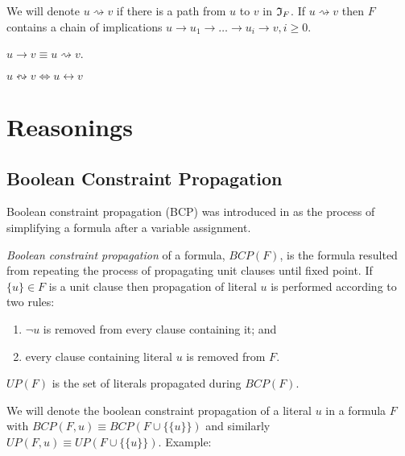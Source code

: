 We will denote $u \rightsquigarrow v$ if there is a path from $u$
to $v$ in $\mathfrak{I}_F$. If $u \rightsquigarrow v$ then $F$ contains a chain
of implications $u \rightarrow u_1 \rightarrow \ldots \rightarrow u_i
\rightarrow v, i \ge 0$.

\begin{myprop}
  $u \rightarrow v \equiv u \rightsquigarrow v$.
\end{myprop}

\begin{myprop}
  \label{myprop:equivalent-literals-in-if}
  $u \leftrightsquigarrow v \iff u \leftrightarrow v$
\end{myprop}


\section{Reasonings}

\subsection{Boolean Constraint Propagation}
\label{ssec:bcp}

Boolean constraint propagation (BCP) was introduced in
\cite{Davis:1960:CPQ:321033.321034} as the process of simplifying
a formula after a variable assignment.

\begin{mydef}
  \emph{Boolean constraint propagation} of a formula, $BCP(F)$, is the formula
  resulted from repeating the process of propagating unit clauses until
  fixed point. If $\{ u \} \in F$ is a unit clause then propagation of literal
  $u$ is performed according to two rules:
  \begin{enumerate}
    \item $\neg u$ is removed from every clause containing it; and
    \item every clause containing literal $u$ is removed from $F$.
  \end{enumerate}
\end{mydef}

\begin{mydef}
$UP(F)$ is the set of literals propagated during $BCP(F)$.
\end{mydef}

We will denote the boolean constraint propagation of a literal $u$ in a
formula $F$ with $BCP(F, u) \equiv BCP(F \cup \{\{ u \}\})$
and similarly $UP(F, u) \equiv UP(F \cup \{\{ u \}\})$. Example:

